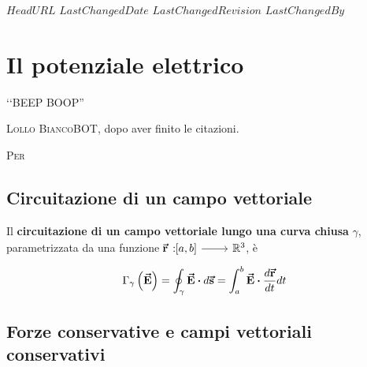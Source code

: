 \svnidlong
{$HeadURL$}
{$LastChangedDate$}
{$LastChangedRevision$}
{$LastChangedBy$}

\chapter{Il potenziale elettrico} %
\begin{introduction}
	‘‘BEEP BOOP''
	\begin{flushright}
		\textsc{Lollo BiancoBOT}, dopo aver finito le citazioni. %
	\end{flushright}
\end{introduction}
\lettrine[findent=1pt, nindent=0pt]{P}{er}  %
\section{Circuitazione di un campo vettoriale}
\begin{define}
	Il \textbf{circuitazione di un campo vettoriale lungo una curva chiusa} $\gamma$, parametrizzata da una funzione $\funz[\vba{r}]{\left[a,b\right]}{\realset^3}$, è
	\begin{equation}
		\Gamma_{\gamma}\left(\vba{E}\right)=\oint_{\gamma}\vba{E}\vdot d\vba{s}=\int_{a}^b\vba{E}\vdot\frac{d\vba{r}}{dt}dt
	\end{equation}
\end{define}
\section{Forze conservative e campi vettoriali conservativi}
